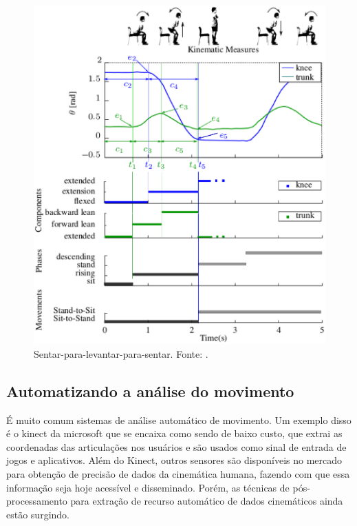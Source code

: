 \begin{figure}[H]
\centering
\includegraphics [keepaspectratio=true,scale=0.60]{figuras/sentaLevanta.eps}
\caption{Sentar-para-levantar-para-sentar. Fonte: \cite{roberto}.}

\label{sentar-para-levantar-para-sentar}
\end{figure}

\subsection{Automatizando a análise do movimento}
  É muito comum sistemas de análise automático de movimento.
Um exemplo disso é o kinect da microsoft que se encaixa como sendo de baixo custo, que
extrai as coordenadas das articulações nos usuários e são usados como sinal de entrada de jogos e aplicativos.
Além do Kinect, outros sensores são disponíveis no mercado para obtenção de precisão de dados da cinemática humana, fazendo com que essa informação seja hoje acessível e disseminado.
Porém, as técnicas de pós-processamento para extração de recurso automático de dados cinemáticos ainda estão surgindo.

